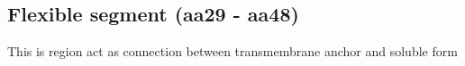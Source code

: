 \subsection{Flexible segment (aa29 - aa48)}

This is region act as connection between transmembrane anchor and soluble form

